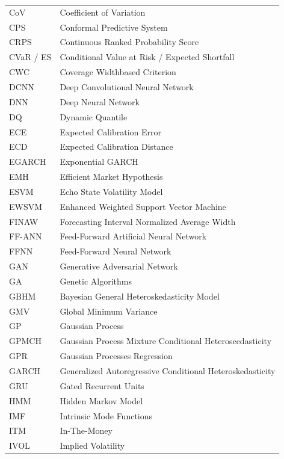 \begin{table}[H]
\begin{subtable}[t]{0.49\textwidth}
\begin{tabular}{lp{}}
        CoV & Coefficient of Variation \\
        CPS & Conformal Predictive System \\
        CRPS & Continuous Ranked Probability Score \\
        CVaR / ES & Conditional Value at Risk / Expected Shortfall \\
        CWC & Coverage Widthbased Criterion \\
        DCNN & Deep Convolutional Neural Network \\
        DNN & Deep Neural Network \\
        DQ & Dynamic Quantile \\
        ECE & Expected Calibration Error \\
        ECD & Expected Calibration Distance \\
        EGARCH & Exponential GARCH \\
        EMH & Efficient Market Hypothesis \\
        ESVM & Echo State Volatility Model \\
        EWSVM & Enhanced Weighted Support Vector Machine \\
        FINAW & Forecasting Interval Normalized Average Width \\
        FF-ANN & Feed-Forward Artificial Neural Network \\
        FFNN & Feed-Forward Neural Network \\
        GAN & Generative Adversarial Network \\
        GA & Genetic Algorithms \\
        GBHM & Bayesian General Heteroskedasticity Model \\
        GMV & Global Minimum Variance \\
        GP & Gaussian Process \\
        GPMCH & Gaussian Process Mixture Conditional Heteroscedasticity \\
        GPR & Gaussian Processes Regression \\
        GARCH & Generalized Autoregressive Conditional Heteroskedasticity \\
        GRU & Gated Recurrent Units \\
        HMM & Hidden Markov Model \\
        IMF & Intrinsic Mode Functions \\
        ITM & In-The-Money \\
        IVOL & Implied Volatility \\

\end{tabular}
\end{subtable}
\end{table}
